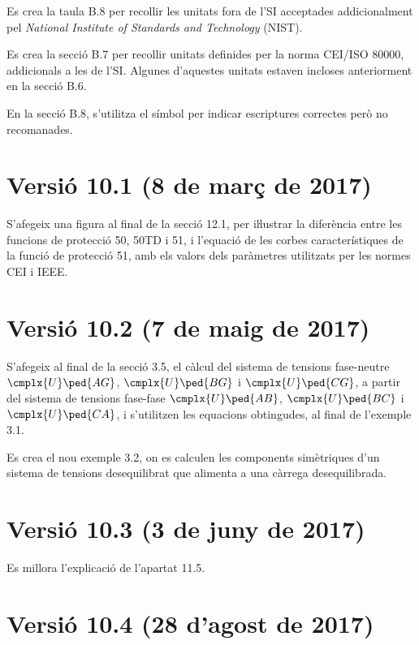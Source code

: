 Es crea la taula B.8 per recollir les unitats fora de l'SI acceptades addicionalment pel \textit{National Institute of Standards and Technology} (NIST).

Es crea la secció B.7 per recollir  unitats definides per la norma  CEI/ISO 80000, addicionals a les de l'SI. Algunes d'aquestes unitats estaven incloses anteriorment en la secció B.6.

En la secció B.8, s'utilitza el símbol \textcolor{Blue}\faQuestionCircle{} per indicar escriptures correctes però no recomanades.

\section*{Versió 10.1 (8 de març de 2017)}

S'afegeix una figura al final de la secció 12.1, per iŀlustrar la diferència entre les funcions de protecció 50, 50TD i 51, i l'equació de les corbes característiques de la funció de protecció 51, amb els valors dels paràmetres utilitzats per les normes CEI i IEEE.

\section*{Versió 10.2 (7 de maig de 2017)}

S'afegeix al final de la secció 3.5, el càlcul del sistema de tensions fase-neutre $\cmplx{U}\ped{AG}$, $\cmplx{U}\ped{BG}$ i $\cmplx{U}\ped{CG}$, a partir del sistema de tensions fase-fase $\cmplx{U}\ped{AB}$, $\cmplx{U}\ped{BC}$ i $\cmplx{U}\ped{CA}$, i s'utilitzen les equacions obtingudes, al final de l'exemple 3.1.

Es crea el nou exemple 3.2, on es calculen les components simètriques d'un sistema de tensions desequilibrat que alimenta a una càrrega desequilibrada.

\section*{Versió 10.3 (3 de juny de 2017)}

Es millora l'explicació de l'apartat 11.5.

\section*{Versió 10.4 (28 d'agost de 2017)}

